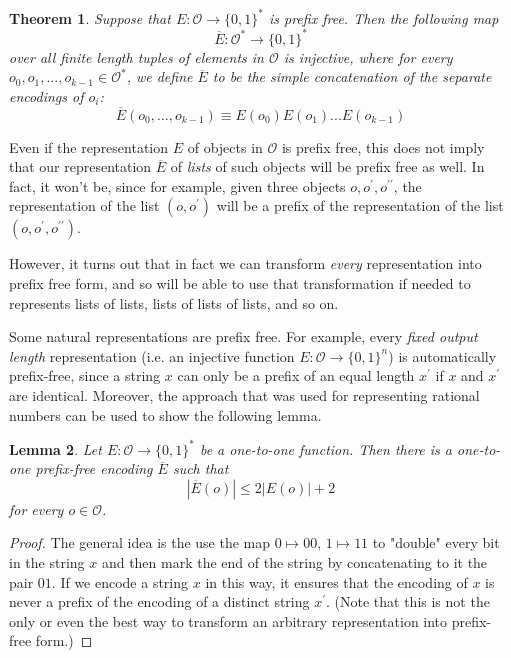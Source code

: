\documentclass[a4paper, 12pt]{report}
\newtheorem{theorem}{Theorem}[section]
\newtheorem{lemma}[theorem]{Lemma}
\theoremstyle{remark}
\theoremstyle{definition}
\begin{document}
\begin{theorem}
Suppose that $E: \mathcal{O} \longrightarrow \{0,1\}^*$ is prefix free. Then the following map 
\[\overline{E}: \mathcal{O}^* \longrightarrow \{0,1\}^*\]
over all finite length tuples of elements in $\mathcal{O}$ is injective, where for every $o_0, o_1, ..., o_{k-1} \in \mathcal{O}^*$, we define $\overline{E}$ to be the simple concatenation of the separate encodings of $o_i$: 
\[\overline{E} (o_0, ..., o_{k-1}) \equiv E(o_0) E(o_1) ... E(o_{k-1})\]
\end{theorem}

Even if the representation $E$ of objects in $\mathcal{O}$ is prefix free, this does not imply that our representation $\overline{E}$ of \textit{lists} of such objects will be prefix free as well. In fact, it won't be, since for example, given three objects $o, o^\prime, o^{\prime\prime}$, the representation of the list $(o, o^\prime)$ will be a prefix of the representation of the list $(o, o^\prime, o^{\prime\prime})$.

However, it turns out that in fact we can transform \textit{every} representation into prefix free form, and so will be able to use that transformation if needed to represents lists of lists, lists of lists of lists, and so on. 

Some natural representations are prefix free. For example, every \textit{fixed output length} representation (i.e. an injective function $E: \mathcal{O} \longrightarrow \{0,1\}^n$) is automatically prefix-free, since a string $x$ can only be a prefix of an equal length $x^\prime$ if $x$ and $x^\prime$ are identical. Moreover, the approach that was used for representing rational numbers can be used to show the following lemma. 

\begin{lemma}
Let $E: \mathcal{O} \longrightarrow \{0,1\}^*$ be a one-to-one function. Then there is a one-to-one prefix-free encoding $\overline{E}$ such that 
\[| \overline{E}(o)| \leq 2 | E(o)| + 2\]
for every $o \in \mathcal{O}$. 
\end{lemma}
\begin{proof}
The general idea is the use the map $0 \mapsto 00$, $1 \mapsto 11$ to "double" every bit in the string $x$ and then mark the end of the string by concatenating to it the pair $01$. If we encode a string $x$ in this way, it ensures that the encoding of $x$ is never a prefix of the encoding of a distinct string $x^\prime$. (Note that this is not the only or even the best way to transform an arbitrary representation into prefix-free form.)
\end{proof}
\end{document}
